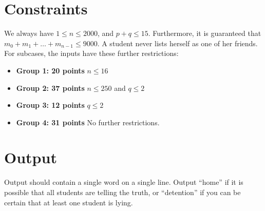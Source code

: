 \section*{Constraints}
We always have $1 \leq n \leq 2000$, and $p + q \leq 15$. Furthermore, it is guaranteed that $m_0 + m_1 + \ldots + m_{n-1} \leq 9000$. A student never lists herself as one of her friends. For subcases, the inputs have these further restrictions:

\begin{itemize}
    \item{\textbf{Group 1: 20 points}} $n \leq 16$
    \item{\textbf{Group 2: 37 points}} $n \leq 250$ and $q \leq 2$
    \item{\textbf{Group 3: 12 points}} $q \leq 2$
    \item{\textbf{Group 4: 31 points}} No further restrictions.
\end{itemize}

\section*{Output}
Output should contain a single word on a single line. Output ``home'' if it is possible that all students are telling the truth, or ``detention'' if you can be certain that at least one student is lying.

